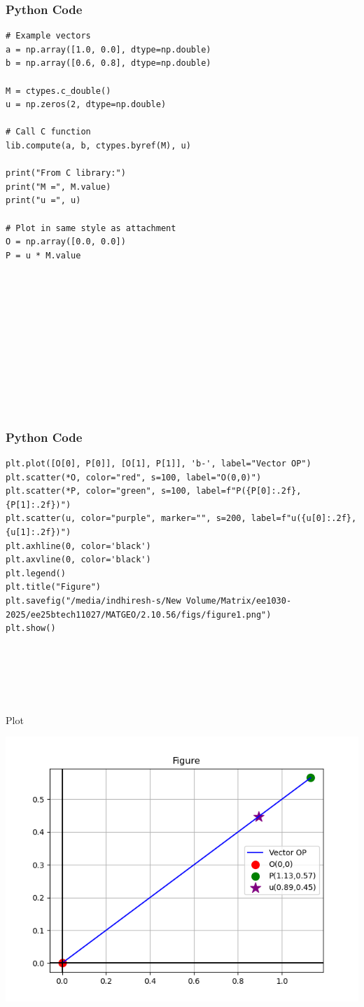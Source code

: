 \documentclass{beamer}
\begin{document}
\begin{frame}[fragile]
    \frametitle{Python Code}
    \begin{lstlisting}
# Example vectors
a = np.array([1.0, 0.0], dtype=np.double)
b = np.array([0.6, 0.8], dtype=np.double)

M = ctypes.c_double()
u = np.zeros(2, dtype=np.double)

# Call C function
lib.compute(a, b, ctypes.byref(M), u)

print("From C library:")
print("M =", M.value)
print("u =", u)

# Plot in same style as attachment
O = np.array([0.0, 0.0])
P = u * M.value












    \end{lstlisting}
\end{frame}

\begin{frame}[fragile]
    \frametitle{Python Code}

    \begin{lstlisting}
plt.plot([O[0], P[0]], [O[1], P[1]], 'b-', label="Vector OP")
plt.scatter(*O, color="red", s=100, label="O(0,0)")
plt.scatter(*P, color="green", s=100, label=f"P({P[0]:.2f},{P[1]:.2f})")
plt.scatter(u, color="purple", marker="", s=200, label=f"u({u[0]:.2f},{u[1]:.2f})")
plt.axhline(0, color='black')
plt.axvline(0, color='black')
plt.legend()
plt.title("Figure")
plt.savefig("/media/indhiresh-s/New Volume/Matrix/ee1030-2025/ee25btech11027/MATGEO/2.10.56/figs/figure1.png")
plt.show()






    \end{lstlisting}
\end{frame}



\begin{frame}{Plot}
    \begin{center}
        \includegraphics[width=\columnwidth, height=0.8\textheight, keepaspectratio]{figs/figure1.png}
    \end{center}
\end{frame}
\end{document}
